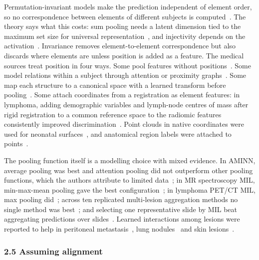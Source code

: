 \documentclass[journal,onecolumn]{IEEEtran}
\begin{document}
Permutation-invariant models make the prediction independent of element order, so no correspondence between elements of different subjects is computed~\cite{Zaheer2017DeepSets,Qi2017PointNet,Ilse2018AttentionMIL,Lee2019SetTransformer}. The theory says what this costs: sum pooling needs a latent dimension tied to the maximum set size for universal representation~\cite{Wagstaff2019Limitations,Wagstaff2022Universal}, and injectivity depends on the activation~\cite{Amir2023Injective,Wang2024PolynomialWidth}. Invariance removes element-to-element correspondence but also discards where elements are unless position is added as a feature. The medical sources treat position in four ways. Some pool features without positions~\cite{Chen2021AMINN,Wilk2025Towards,Geady2025Radiomic,Sabouri2025Enhancing,Diao2024Multi}. Some model relations within a subject through attention or proximity graphs~\cite{Yang2020NoduleSAT,Shao2021TransMIL,Prabhakar2023Selfpruning,Li2025MultiStage,Collenne2024ReSeT}. Some map each structure to a canonical space with a learned transform before pooling~\cite{GutierrezBecker2018MSPNet}. Some attach coordinates from a registration as element features: in lymphoma, adding demographic variables and lymph-node centres of mass after rigid registration to a common reference space to the radiomic features consistently improved discrimination~\cite{Karimzadeh2026Revisiting}. Point clouds in native coordinates were used for neonatal surfaces~\cite{Vosylius2020NeonatalSurface}, and anatomical region labels were attached to points~\cite{Islam2026NeuroAPS}.

The pooling function itself is a modelling choice with mixed evidence. In AMINN, average pooling was best and attention pooling did not outperform other pooling functions, which the authors attribute to limited data~\cite{Chen2021AMINN}; in MR spectroscopy MIL, min-max-mean pooling gave the best configuration~\cite{Gacheva2026Multiple}; in lymphoma PET/CT MIL, max pooling did~\cite{Xu2024Hybrid}; across ten replicated multi-lesion aggregation methods no single method was best~\cite{Geady2025Radiomic}; and selecting one representative slide by MIL beat aggregating predictions over slides~\cite{Verdelho2025MIL}. Learned interactions among lesions were reported to help in peritoneal metastasis~\cite{Li2025MultiStage}, lung nodules~\cite{Yang2020NoduleSAT} and skin lesions~\cite{Collenne2024ReSeT}.

\subsubsection{2.5 Assuming alignment}
\end{document}
